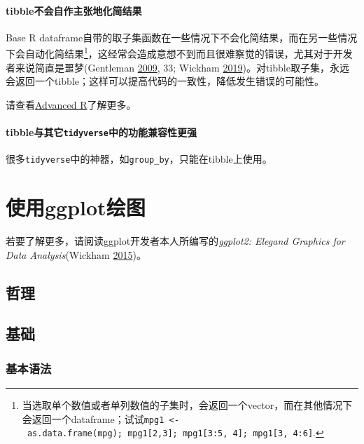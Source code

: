 \documentclass[]{book}
\let\rmarkdownfootnote\footnote%
\def\footnote{\protect\rmarkdownfootnote}
\begin{document}
\hypertarget{tibble-df-diff-simplify}{%
\subsubsection{tibble不会自作主张地化简结果}\label{tibble-df-diff-simplify}}

Base R dataframe自带的取子集函数在一些情况下不会化简结果，而在另一些情况下会自动化简结果\footnote{当选取单个数值或者单列数值的子集时，会返回一个vector，而在其他情况下会返回一个dataframe；试试\texttt{mpg1\ \textless{}-\ as.data.frame(mpg);\ mpg1{[}2,3{]};\ mpg1{[}3:5,\ 4{]};\ mpg1{[}3,\ 4:6{]}}.}，这经常会造成意想不到而且很难察觉的错误，尤其对于开发者来说简直是噩梦(Gentleman \protect\hyperlink{ref-Gentleman2009R-Programming-Bioinfo}{2009}, 33; Wickham \protect\hyperlink{ref-Wickham:2019}{2019})。对tibble取子集，永远会返回一个tibble；这样可以提高代码的一致性，降低发生错误的可能性。

请查看\href{https://adv-r.hadley.nz/subsetting.html\#simplify-preserve}{Advanced R}了解更多。

\hypertarget{tibble-df-diff-compatibility}{%
\subsubsection{\texorpdfstring{tibble与其它\texttt{tidyverse}中的功能兼容性更强}{tibble与其它tidyverse中的功能兼容性更强}}\label{tibble-df-diff-compatibility}}

很多\texttt{tidyverse}中的神器，如\texttt{group\_by}，只能在tibble上使用。

\hypertarget{graphics}{%
\chapter{使用ggplot绘图}\label{graphics}}

若要了解更多，请阅读ggplot开发者本人所编写的\emph{ggplot2: Elegand Graphics for Data Analysis}(Wickham \protect\hyperlink{ref-Wickham2015ggplot2-Elegant-Gra}{2015})。

\hypertarget{g-phil}{%
\section{哲理}\label{g-phil}}

\hypertarget{g-basics}{%
\section{基础}\label{g-basics}}

\hypertarget{g-basics-grammar}{%
\subsection{基本语法}\label{g-basics-grammar}}
\end{document}

